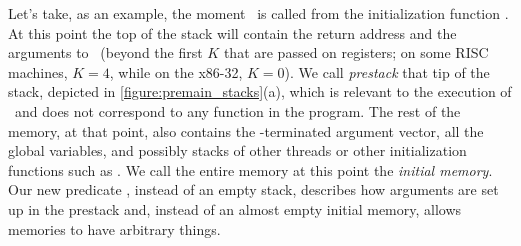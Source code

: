 Let's take, as an example, the moment \main\ is called from the initialization function . At this point the top of the stack will contain the return address and the arguments to \main\  (beyond the first $K$ that are passed on registers; on some RISC machines, $K=4$, while on the x86-32, $K=0$). We call \emph{prestack} that tip of the stack, depicted in \autoref{figure:premain_stacks}(a), which is relevant to the execution of \main\ and does not correspond to any function in the program. The rest of the memory, at that point, also contains the -terminated argument vector, all the global variables, and possibly stacks of other threads or other initialization functions such as . We call the entire memory at this point the \emph{initial memory}. 
Our new predicate , instead of an empty stack, describes how arguments are set up in the prestack and, instead of an almost empty initial memory, allows memories to have arbitrary things. %



